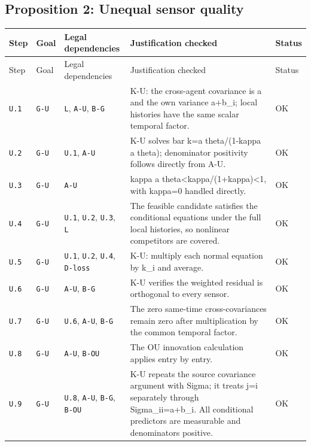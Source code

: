 \documentclass[11pt,letterpaper]{article}
\begin{document}
{\subsection{Proposition 2: Unequal sensor quality}
\begin{longtable}{>{\raggedright\arraybackslash}p{.10\linewidth}>{\raggedright\arraybackslash}p{.08\linewidth}>{\raggedright\arraybackslash}p{.19\linewidth}>{\raggedright\arraybackslash}p{.46\linewidth}>{\raggedright\arraybackslash}p{.08\linewidth}}
\toprule
Step & Goal & Legal dependencies & Justification checked & Status \\
\midrule\endfirsthead
\toprule
Step & Goal & Legal dependencies & Justification checked & Status \\
\midrule\endhead
\bottomrule\endfoot
\texttt{U.1} & \texttt{G-U} & \texttt{L}, \texttt{A-U}, \texttt{B-G} & K-U: the cross-agent covariance is a and the own variance a+b\_i; local histories have the same scalar temporal factor. & OK \\[3pt]
\texttt{U.2} & \texttt{G-U} & \texttt{U.1}, \texttt{A-U} & K-U solves bar k=a theta/(1-kappa a theta); denominator positivity follows directly from A-U. & OK \\[3pt]
\texttt{U.3} & \texttt{G-U} & \texttt{A-U} & kappa a theta<kappa/(1+kappa)<1, with kappa=0 handled directly. & OK \\[3pt]
\texttt{U.4} & \texttt{G-U} & \texttt{U.1}, \texttt{U.2}, \texttt{U.3}, \texttt{L} & The feasible candidate satisfies the conditional equations under the full local histories, so nonlinear competitors are covered. & OK \\[3pt]
\texttt{U.5} & \texttt{G-U} & \texttt{U.1}, \texttt{U.2}, \texttt{U.4}, \texttt{D-loss} & K-U: multiply each normal equation by k\_i and average. & OK \\[3pt]
\texttt{U.6} & \texttt{G-U} & \texttt{A-U}, \texttt{B-G} & K-U verifies the weighted residual is orthogonal to every sensor. & OK \\[3pt]
\texttt{U.7} & \texttt{G-U} & \texttt{U.6}, \texttt{A-U}, \texttt{B-G} & The zero same-time cross-covariances remain zero after multiplication by the common temporal factor. & OK \\[3pt]
\texttt{U.8} & \texttt{G-U} & \texttt{A-U}, \texttt{B-OU} & The OU innovation calculation applies entry by entry. & OK \\[3pt]
\texttt{U.9} & \texttt{G-U} & \texttt{U.8}, \texttt{A-U}, \texttt{B-G}, \texttt{B-OU} & K-U repeats the source covariance argument with Sigma; it treats j=i separately through Sigma\_ii=a+b\_i. All conditional predictors are measurable and denominators positive. & OK \\[3pt]

\end{longtable}}
\end{document}
